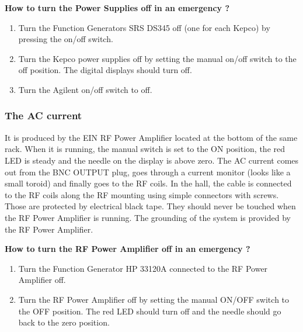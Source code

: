 {\begin{safetyen}{10}{5}
\centerline {\bf How to turn the Power Supplies off in an
emergency ?}

\begin{enumerate}

\item Turn the Function Generators SRS DS345 off (one for each Kepco) by
pressing the on/off switch.

\item Turn the Kepco power supplies off by setting the manual on/off
switch to the off position. The digital 
displays should turn off. 

\item Turn the Agilent on/off switch to off. 

\end{enumerate} 

\subsubsection{ The AC current}

It is produced by the EIN RF Power Amplifier located at the bottom of
the same rack. When 
it is running, the manual switch is set to the ON position, the red LED
is steady and the needle on the display is
above zero. The AC current comes out from the BNC OUTPUT plug, goes
through a current monitor (looks like a small
toroid) and finally goes to the RF coils. In the hall, the cable is
connected to the RF coils along the RF
mounting using simple connectors with screws. Those are protected by
electrical black tape. They should never be
touched when the RF Power Amplifier is running.  The grounding of the
system is provided by the RF Power Amplifier.

\centerline {\bf How to turn the RF Power Amplifier off in an emergency
?}

\begin{enumerate}

\item Turn the Function Generator HP 33120A connected to the RF Power
Amplifier off.

\item Turn the RF Power Amplifier off by setting the manual ON/OFF
switch to the OFF position. The red LED 
should turn off and the needle should go back to the zero position. 

\end{enumerate} 



\end{safetyen}}
